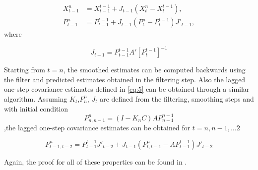 \documentclass{article}
\begin{document}
\begin{equation}\label{eq:9}
    \begin{split}
        X_{t-1}^n&=X_{t-1}^{t-1} + J_{t-1}(X_t^n-X_t^{t-1}), \\
        P_{t-1}^n&=P_{t-1}^{t-1} + J_{t-1}(P_t^n-P_t^{t-1})J'_{t-1},
    \end{split}
\end{equation}
where 

\begin{equation}\label{eq:10}
    J_{t-1} = P_{t-1}^{t-1}A'[P_{t}^{t-1}]^{-1}
\end{equation}

Starting from $t=n$, the smoothed estimates can be computed backwards using the filter and predicted estimates obtained in the filtering step. Also the lagged one-step covariance estimates defined in \ref{eq:5} can be obtained through a similar algorithm. Assuming $K_t$,$P_n^n$, $J_t$ are defined from the filtering, smoothing steps and with initial condition 
\begin{equation}\label{eq:11}
    P^n_{n,n-1} = (I - K_nC)AP_{n-1}^{n-1}    
\end{equation}
,the lagged one-step covariance estimates can be obtained for $t=n,n-1,...2$

\begin{equation}\label{eq:12}
    P_{t-1,t-2}^n=P_{t-1}^{t-1}J'_{t-2} + J_{t-1}(P^n_{t,t-1}-AP_{t-1}^{t-1})J'_{t-2}
\end{equation}

Again, the proof for all of these properties can be found in \cite{shumstof2000}.
\end{document}
